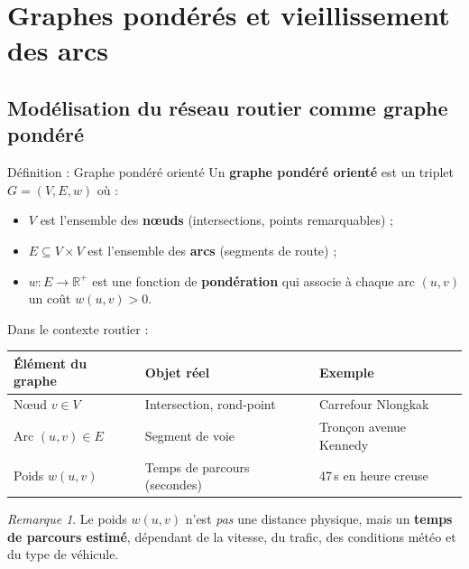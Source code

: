\documentclass[12pt,a4paper]{article}
\theoremstyle{definition}
\theoremstyle{remark}
\newtheorem{remarque}{Remarque}[section]
\begin{document}
\newpage

\section{Graphes pondérés et vieillissement des arcs}

\subsection{Modélisation du réseau routier comme graphe pondéré}

\begin{defbox}{Définition : Graphe pondéré orienté}
Un \textbf{graphe pondéré orienté} est un triplet $G = (V, E, w)$ où :
\begin{itemize}
  \item $V$ est l'ensemble des \textbf{nœuds} (intersections, points remarquables) ;
  \item $E \subseteq V \times V$ est l'ensemble des \textbf{arcs} (segments de route) ;
  \item $w : E \to \mathbb{R}^+$ est une fonction de \textbf{pondération} qui
        associe à chaque arc $(u,v)$ un coût $w(u,v) > 0$.
\end{itemize}
\end{defbox}

Dans le contexte routier :
\begin{center}
\begin{tabular}{lll}
  \toprule
  \textbf{Élément du graphe} & \textbf{Objet réel} & \textbf{Exemple} \\
  \midrule
  Nœud $v \in V$ & Intersection, rond-point & Carrefour Nlongkak \\
  Arc $(u,v) \in E$ & Segment de voie & Tronçon avenue Kennedy \\
  Poids $w(u,v)$ & Temps de parcours (secondes) & 47\,s en heure creuse \\
  \bottomrule
\end{tabular}
\end{center}

\begin{remarque}
  Le poids $w(u,v)$ n'est \emph{pas} une distance physique, mais un
  \textbf{temps de parcours estimé}, dépendant de la vitesse, du trafic,
  des conditions météo et du type de véhicule.
\end{remarque}
\end{document}
